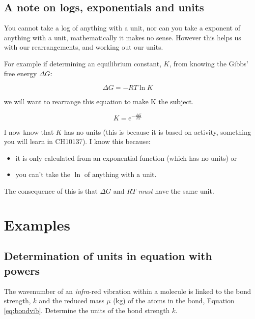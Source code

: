 \documentclass[
]{book}
\providecommand{\tightlist}{%
  \setlength{\itemsep}{0pt}\setlength{\parskip}{0pt}}
\begin{document}
\hypertarget{a-note-on-logs-exponentials-and-units}{%
\subsection{A note on logs, exponentials and units}\label{a-note-on-logs-exponentials-and-units}}

You cannot take a log of anything with a unit, nor can you take a exponent of anything with a unit, mathematically it makes no sense. However this helps us with our rearrangements, and working out our units.

For example if determining an equilibrium constant, \(K\), from knowing the Gibbs' free energy \(\Delta G\):

\begin{equation*}
\Delta G = -RT \ln K
\end{equation*}

we will want to rearrange this equation to make K the subject.

\begin{equation*}
K = \textrm{e}^{-\frac{\Delta G}{RT}}
\end{equation*}

I now know that \(K\) has no units (this is because it is based on activity, something you will learn in CH10137). I know this because:

\begin{itemize}
\tightlist
\item
  it is only calculated from an exponential function (which has no units) or
\item
  you can't take the \(\ln\) of anything with a unit.
\end{itemize}

The consequence of this is that \(\Delta G\) and \(RT\) \emph{must} have the same unit.

\hypertarget{sec:examples2}{%
\section{Examples}\label{sec:examples2}}

\hypertarget{determination-of-units-in-equation-with-powers}{%
\subsection{Determination of units in equation with powers}\label{determination-of-units-in-equation-with-powers}}

The wavenumber of an \emph{infra}-red vibration within a molecule is linked to the bond strength, \(k\) and the reduced mass \(\mu\) (kg) of the atoms in the bond, Equation \eqref{eq:bondvib}. Determine the units of the bond strength \(k\).
\end{document}
